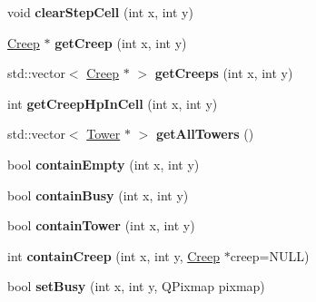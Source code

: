 \begin{DoxyCompactItemize}
\item 
\hypertarget{class_field_a3f9416c61e8a4522f5f206ef2fe938a8}{}void {\bfseries clear\+Step\+Cell} (int x, int y)\label{class_field_a3f9416c61e8a4522f5f206ef2fe938a8}

\item 
\hypertarget{class_field_aac297035b7eea38e6b423ae7e3f827fe}{}\hyperlink{class_creep}{Creep} $\ast$ {\bfseries get\+Creep} (int x, int y)\label{class_field_aac297035b7eea38e6b423ae7e3f827fe}

\item 
\hypertarget{class_field_a6240c7535d883ce0d134d79db61aa82f}{}std\+::vector$<$ \hyperlink{class_creep}{Creep} $\ast$ $>$ {\bfseries get\+Creeps} (int x, int y)\label{class_field_a6240c7535d883ce0d134d79db61aa82f}

\item 
\hypertarget{class_field_a76311efb6f6074e2bc625788af6616c0}{}int {\bfseries get\+Creep\+Hp\+In\+Cell} (int x, int y)\label{class_field_a76311efb6f6074e2bc625788af6616c0}

\item 
\hypertarget{class_field_a6488e0a9a79d3fb3ea09dce603b7cd4c}{}std\+::vector$<$ \hyperlink{class_tower}{Tower} $\ast$ $>$ {\bfseries get\+All\+Towers} ()\label{class_field_a6488e0a9a79d3fb3ea09dce603b7cd4c}

\item 
\hypertarget{class_field_af9e881fbdf5242af5fca52eee719e54d}{}bool {\bfseries contain\+Empty} (int x, int y)\label{class_field_af9e881fbdf5242af5fca52eee719e54d}

\item 
\hypertarget{class_field_afdc638e09aeb18927c028be629cd7bd2}{}bool {\bfseries contain\+Busy} (int x, int y)\label{class_field_afdc638e09aeb18927c028be629cd7bd2}

\item 
\hypertarget{class_field_a87fce2e7c08f64e6fad7fac237d7f609}{}bool {\bfseries contain\+Tower} (int x, int y)\label{class_field_a87fce2e7c08f64e6fad7fac237d7f609}

\item 
\hypertarget{class_field_a26f11890821c58099f23c96bbb2cfe76}{}int {\bfseries contain\+Creep} (int x, int y, \hyperlink{class_creep}{Creep} $\ast$creep=N\+U\+L\+L)\label{class_field_a26f11890821c58099f23c96bbb2cfe76}

\item 
\hypertarget{class_field_a59a79569b81754d6e969b9147a2984ee}{}bool {\bfseries set\+Busy} (int x, int y, Q\+Pixmap pixmap)\label{class_field_a59a79569b81754d6e969b9147a2984ee}


\end{DoxyCompactItemize}
